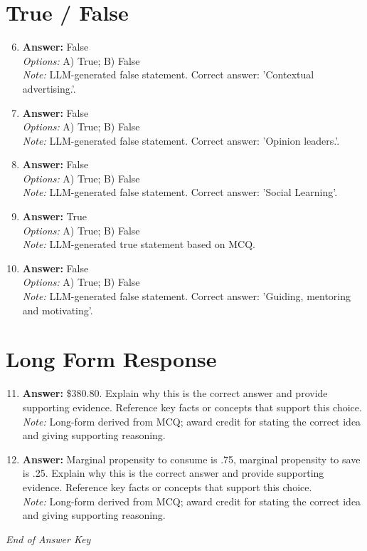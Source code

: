\documentclass[12pt]{article}
\begin{document}
\section*{True / False}
\begin{enumerate}[label=\arabic*.]
\setcounter{enumi}{5}
\item \textbf{Answer:} False
\\ \textit{Options:} A) True; B) False
\\ \textit{Note:} LLM-generated false statement. Correct answer: 'Contextual advertising.'.
\item \textbf{Answer:} False
\\ \textit{Options:} A) True; B) False
\\ \textit{Note:} LLM-generated false statement. Correct answer: 'Opinion leaders.'.
\item \textbf{Answer:} False
\\ \textit{Options:} A) True; B) False
\\ \textit{Note:} LLM-generated false statement. Correct answer: 'Social Learning'.
\item \textbf{Answer:} True
\\ \textit{Options:} A) True; B) False
\\ \textit{Note:} LLM-generated true statement based on MCQ.
\item \textbf{Answer:} False
\\ \textit{Options:} A) True; B) False
\\ \textit{Note:} LLM-generated false statement. Correct answer: 'Guiding, mentoring and motivating'.
\end{enumerate}

\section*{Long Form Response}
\begin{enumerate}[label=\arabic*.]
\setcounter{enumi}{10}
\item \textbf{Answer:} \$380.80. Explain why this is the correct answer and provide supporting evidence. Reference key facts or concepts that support this choice.
\\ \textit{Note:} Long-form derived from MCQ; award credit for stating the correct idea and giving supporting reasoning.
\item \textbf{Answer:} Marginal propensity to consume is .75, marginal propensity to save is .25. Explain why this is the correct answer and provide supporting evidence. Reference key facts or concepts that support this choice.
\\ \textit{Note:} Long-form derived from MCQ; award credit for stating the correct idea and giving supporting reasoning.
\end{enumerate}

\vfill
\noindent\textit{End of Answer Key}
\end{document}
